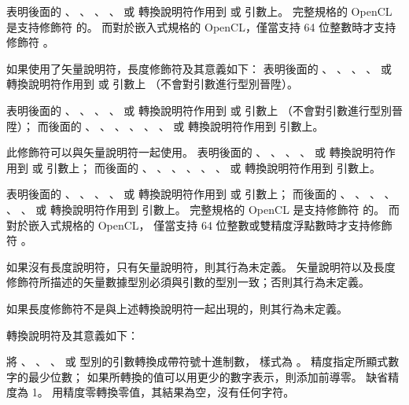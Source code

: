 {{
表明後面的 、 、 、 、
  或  轉換說明符作用到  或  引數上。
完整規格的 OpenCL 是支持修飾符  的。
而對於嵌入式規格的 OpenCL，僅當支持 64 位整數時才支持修飾符 。
\stopclSpecifier

如果使用了矢量說明符，長度修飾符及其意義如下：
表明後面的 、 、 、 、  或 
 轉換說明符作用到  或  引數上
（不會對引數進行型別晉陞）。
\stopclSpecifier

表明後面的 、 、 、 、  或 
 轉換說明符作用到  或  引數上
（不會對引數進行型別晉陞）；
而後面的 、 、 、 、 、 、
  或  轉換說明符作用到  引數上。
\stopclSpecifier

此修飾符可以與矢量說明符一起使用。
表明後面的 、 、 、 、  或 
 轉換說明符作用到  或  引數上；
而後面的 、 、 、 、 、 、
  或  轉換說明符作用到  引數上。
\stopclSpecifier

表明後面的 、 、 、 、  或 
 轉換說明符作用到  或  引數上；
而後面的 、 、 、 、 、 、
  或  轉換說明符作用到  引數上。
完整規格的 OpenCL 是支持修飾符  的。
而對於嵌入式規格的 OpenCL，
僅當支持 64 位整數或雙精度浮點數時才支持修飾符 。
\stopclSpecifier

\startnotepar
如果沒有長度說明符，只有矢量說明符，則其行為未定義。
矢量說明符以及長度修飾符所描述的矢量數據型別必須與引數的型別一致；否則其行為未定義。

如果長度修飾符不是與上述轉換說明符一起出現的，則其行為未定義。
\stopnotepar

轉換說明符及其意義如下：

將 、 、 、
  或  型別的引數轉換成帶符號十進制數，
樣式為 。
精度指定所顯式數字的最少位數；
如果所轉換的值可以用更少的數字表示，則添加前導零。
缺省精度為 1。
用精度零轉換零值，其結果為空，沒有任何字符。
\stopclSpecifier

}}

